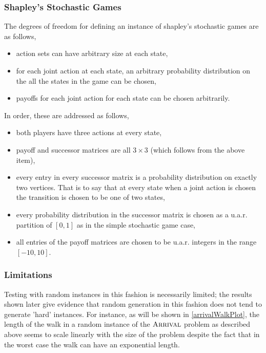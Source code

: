\subsubsection{Shapley's Stochastic Games} \label{shapleyRandom}
The degrees of freedom for defining an instance of shapley's stochastic games are as follows,
\begin{itemize}
  \item action sets can have arbitrary size at each state,
  \item for each joint action at each state, an arbitrary probability distribution on the all
    the states in the game can be chosen,
  \item payoffs for each joint action for each state can be chosen arbitrarily.
\end{itemize}
In order, these are addressed as follows,
\begin{itemize}
  \item both players have three actions at every state,
  \item payoff and successor matrices are all $3 \times 3$ (which follows from the above item),
  \item every entry in every successor matrix is a probability distribution on exactly two vertices.
    That is to say that at every state when a joint action is chosen the transition is chosen
    to be one of two states,
  \item every probability distribution in the successor matrix is chosen as a u.a.r. partition of $[0, 1]$
    as in the simple stochastic game case,
  \item all entries of the payoff matrices are chosen to be u.a.r. integers in the range $[-10, 10]$.
\end{itemize}
\subsubsection{Limitations}
Testing with random instances in this fashion is necessarily limited; the results
shown later give evidence that random generation in this fashion does not tend to generate 'hard' instances.
For instance, as will be shown in \cref{arrivalWalkPlot}, the length of the walk in a random instance
of the $\textsc{Arrival}$ problem as described above seems to scale linearly with the size of the problem despite
the fact that in the worst case the walk can have an exponential length.
